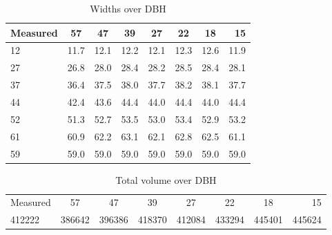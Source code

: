 \begin{table}[h!]
	\begin{center}
		\begin{tabular}{| l c c c c c c r |}
		\hline
		Measured & 57\degree & 47\degree & 39\degree & 27\degree & 22\degree & 18\degree & 15\degree \\
		\hline
		12       & 11.7      & 12.1      & 12.2      & 12.1      & 12.3      & 12.6      & 11.9      \\
		27       & 26.8      & 28.0      & 28.4      & 28.2      & 28.5      & 28.4      & 28.1      \\
		37       & 36.4      & 37.5      & 38.0      & 37.7      & 38.2      & 38.1      & 37.7      \\
		44       & 42.4      & 43.6      & 44.4      & 44.0      & 44.4      & 44.0      & 44.4      \\
		52       & 51.3      & 52.7      & 53.5      & 53.0      & 53.4      & 52.9      & 53.2      \\
		61       & 60.9      & 62.2      & 63.1      & 62.1      & 62.8      & 62.5      & 61.1      \\
		59       & 59.0      & 59.0      & 59.0      & 59.0      & 59.0      & 59.0      & 59.0      \\
		\hline
		\end{tabular}
		\caption{Widths over DBH}
		\label{widths}
    \end{center}
\end{table}

\begin{table}[h!]
	\begin{center}
    	\begin{tabular}{| l c c c c c c r |}
    	\hline
		Measured & 57\degree & 47\degree & 39\degree & 27\degree & 22\degree & 18\degree & 15\degree \\
		412222   & 386642    & 396386    & 418370    & 412084    & 433294    & 445401    & 445624    \\
		\hline
		\end{tabular}
		\caption{Total volume over DBH}
		\label{volumes}
    \end{center}
\end{table}